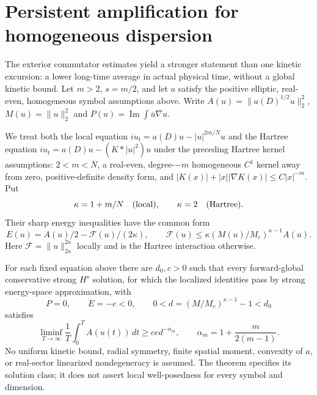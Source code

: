\section{Persistent amplification for homogeneous dispersion}
\label{sec:r13-persistent-general}

The exterior commutator estimates yield a stronger statement than one
kinetic excursion: a lower long-time average in actual physical time,
without a global kinetic bound. Let $m>2$, $s=m/2$, and let $a$ satisfy
the positive elliptic, real-even, homogeneous symbol assumptions above.
Write $A(u)=\|a(D)^{1/2}u\|_2^2$, $M(u)=\|u\|_2^2$ and
$P(u)=\operatorname{Im}\int\overline u\nabla u$.

We treat both the local equation $iu_t=a(D)u-|u|^{2m/N}u$ and the
Hartree equation $iu_t=a(D)u-(K*|u|^2)u$ under the preceding Hartree
kernel assumptions: $2<m<N$, a real-even, degree-$-m$ homogeneous
$C^1$ kernel away from zero, positive-definite density form, and
$|K(x)|+|x||\nabla K(x)|\le C|x|^{-m}$. Put
\[
 \kappa=1+m/N\quad\hbox{(local)},\qquad
 \kappa=2\quad\hbox{(Hartree)}.
\]
Their sharp energy inequalities have the common form
\[
 E(u)=A(u)/2-\mathcal F(u)/(2\kappa),\qquad
 \mathcal F(u)\le\kappa(M(u)/M_c)^{\kappa-1}A(u).
\]
Here $\mathcal F=\|u\|_{2\kappa}^{2\kappa}$ locally and is the Hartree
interaction otherwise.

\begin{theorem}\label{thm:r13-general-average}
For each fixed equation above there are $d_0,c>0$ such that every
forward-global conservative strong $H^s$ solution, for which the
localized identities pass by strong energy-space approximation, with
\[
 P=0,\qquad E=-e<0,\qquad
 0<d=(M/M_c)^{\kappa-1}-1<d_0
\]
satisfies
\begin{equation}\label{eq:r13-general-average}
 \boxed{\quad
 \liminf_{T\to\infty}\frac1T\int_0^T A(u(t))\,dt
 \ge c e d^{-\alpha_m},\qquad
 \alpha_m=1+\frac{m}{2(m-1)}.
 \quad}
\end{equation}
No uniform kinetic bound, radial symmetry, finite spatial moment,
convexity of $a$, or real-sector linearized nondegeneracy is assumed.
The theorem specifies its solution class; it does not assert local
well-posedness for every symbol and dimension.
\end{theorem}


